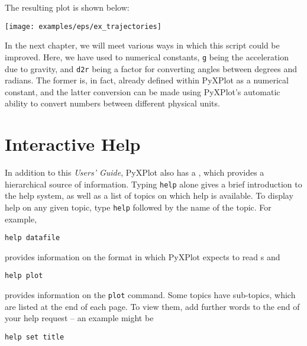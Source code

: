 {{\newline
{}\newline
{}\newline
{}
}
\nlscf
The resulting plot is shown below:
\nlscf
\begin{center}
\texttt{[image: examples/eps/ex\_trajectories]}
\end{center}
\nlscf
In the next chapter, we will meet various ways in which this script could be
improved. Here, we have used to numerical constants, {\tt g} being the
acceleration due to gravity, and {\tt d2r} being a factor for converting angles
between degrees and radians.  The former is, in fact, already defined within
PyXPlot as a numerical constant, and the latter conversion can be made using
PyXPlot's automatic ability to convert numbers between different physical
units.
}

\section{Interactive Help}

In addition to this {\it Users' Guide}, PyXPlot also has a ,
which provides a hierarchical source of information. Typing {\tt help} alone
gives a brief introduction to the help system, as well as a list of topics on
which help is available. To display help on any given topic, type {\tt help}
followed by the name of the topic. For example,

\begin{verbatim}
help datafile
\end{verbatim}

\noindent provides information on the format in which PyXPlot expects to read
\datafile s and

\begin{verbatim}
help plot
\end{verbatim}

\noindent provides information on the {\tt plot} command.  Some topics have
sub-topics, which are listed at the end of each page. To view them, add further
words to the end of your help request -- an example might be

\begin{verbatim}
help set title
\end{verbatim}

